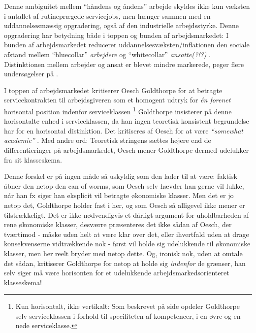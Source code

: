 Denne ambiguitet mellem “håndens og åndens” arbejde skyldes ikke kun væksten i antallet af rutineprægede servicejobs, men hænger sammen med en uddannelsesmæssig opgradering, også af den industrielle arbejdsstyrke. Denne opgradering har betydning både i toppen og bunden af arbejdsmarkedet: I bunden af arbejdsmarkedet
reducerer uddannelsesvæksten/inflationen den sociale afstand mellem “bluecollar” \emph{arbejdere} og “whitecollar” \emph{ansatte(?!?)} . Distinktionen mellem arbejder og ansat er blevet mindre markerede, peger flere undersøgelser på \parencite[49]{Oesch2006a}. 

I toppen af arbejdsmarkedet kritiserer Oesch Goldthorpe for at betragte servicekontrakten til arbejdsgiveren som et homogent udtryk for \emph{én forenet} horisontal position indenfor serviceklassen%
%
\footnote{ Kun horisontalt, ikke vertikalt: Som beskrevet på side \pageref{klasse egp11} opdeler Goldthorpe selv serviceklassen i forhold til specifiteten af kompetencer, i en øvre og en nede serviceklasse.}%
%
 Goldthorpe insisterer på denne horisontalte enhed i serviceklassen, da han ingen teoretisk konsistent begrundelse har for en horisontal distinktion. Det kritiseres af Oesch for at være \emph{“somewhat academic”} \parencite[53]{Oesch2006a}. Med andre ord: Teoretisk stringens sættes højere end de differentieringer på arbejdsmarkedet, Oesch mener Goldthorpe dermed udelukker fra sit klasseskema.





 Denne forskel er på ingen måde så uskyldig som den lader til at være: faktisk åbner den netop den can of worms, som Oesch selv hævder han gerne vil lukke, når han fx siger han eksplicit vil betragte økonomiske klasser. Men det er jo netop det, Goldthorpe holder fast i her, og som Oesch så alligevel ikke mener er tilstrækkeligt. Det er ikke nødvendigvis et dårligt argument for uholdbarheden af rene økonomiske klasser, desværre præsenteres det ikke sådan af Oesch, der tværtimod - måske uden helt at være klar over det, eller ihvertfald uden at drage konsekvenserne vidtrækkende nok - først vil holde sig udelukkende til økonomiske klasser, men her reelt bryder med netop dette. Og, ironisk nok, uden at omtale det sådan, kritiserer Goldthorpe for netop at holde sig \emph{indenfor} de grænser, han selv siger må være horisonten for et udelukkende arbejdsmarkedsorienteret klasseskema! 







